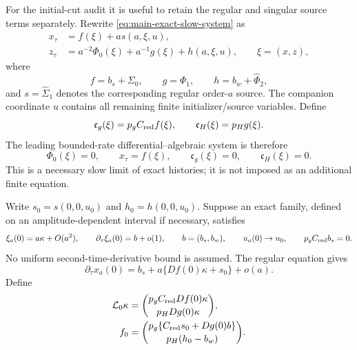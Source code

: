\documentclass[11pt]{article}
\numberwithin{equation}{section}
\theoremstyle{definition}
\theoremstyle{remark}
\begin{document}
For the initial-cut audit it is useful to retain the regular and singular
source terms separately.  Rewrite \eqref{eq:main-exact-slow-system} as
\begin{align}
 x_\tau&=f(\xi)+a s(a,\xi,u),\label{eq:supp-exact-source-x}\\
 z_\tau&=a^{-2}\Phi_0(\xi)+a^{-1}g(\xi)+h(a,\xi,u),
 \qquad \xi=(x,z),
 \label{eq:supp-exact-source-z}
\end{align}
where
\begin{equation}
 f=b_s+\Sigma_0,
 \qquad g=\Phi_1,
 \qquad h=b_w+\widehat\Phi_2,
 \label{eq:supp-exact-source-identification}
\end{equation}
and $s=\widehat\Sigma_1$ denotes the corresponding regular order-$a$
source.  The companion coordinate $u$ contains all remaining finite
initializer/source variables.  Define
\begin{equation}
 \mathfrak c_g(\xi)=p_gC_{\rm red}f(\xi),
 \qquad
 \mathfrak c_H(\xi)=p_Hg(\xi).
 \label{eq:supp-exact-c-functions}
\end{equation}
The leading bounded-rate differential--algebraic system is therefore
\begin{equation}
 \Phi_0(\xi)=0,\qquad x_\tau=f(\xi),
 \qquad \mathfrak c_g(\xi)=0,\qquad \mathfrak c_H(\xi)=0.
 \label{eq:supp-exact-leading-dae}
\end{equation}
This is a necessary slow limit of exact histories; it is not imposed as an
additional finite equation.

Write $s_0=s(0,0,u_0)$ and $h_0=h(0,0,u_0)$.  Suppose an exact family,
defined on an amplitude-dependent interval if necessary, satisfies
\begin{equation}
 \xi_a(0)=a\kappa+O(a^2),\qquad
 \partial_\tau\xi_a(0)=b+o(1),\qquad b=(b_s,b_w),
 \qquad u_a(0)\to u_0,
 \qquad p_gC_{\rm red}b_s=0.
 \label{eq:supp-exact-initial-jets-corrected}
\end{equation}
No uniform second-time-derivative bound is assumed.  The regular equation
gives
\begin{equation}
 \partial_\tau x_a(0)
 =b_s+a\{Df(0)\kappa+s_0\}+o(a).
 \label{eq:supp-exact-initial-xprime}
\end{equation}
Define
\begin{align}
 \mathcal L_0\kappa
 &=\binom{p_gC_{\rm red}Df(0)\kappa}{p_HDg(0)\kappa},
 \label{eq:supp-L0-definition}\\
 f_0
 &=\binom{p_g\{C_{\rm red}s_0+Dg(0)b\}}
               {p_H(h_0-b_w)}.
 \label{eq:supp-f0-definition}
\end{align}
\end{document}
